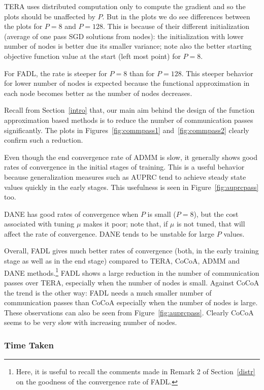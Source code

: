 \documentclass[twoside, 11pt]{article}
\begin{document}
TERA uses distributed computation only to compute the gradient and so the plots should be unaffected by $P$. But in the plots we do see differences between the plots for $P=8$ and $P=128$. This is because of their different initialization (average of one pass SGD solutions from nodes): the initialization with lower number of nodes is better due its smaller variance; note also the better starting objective function value at the start (left most point) for $P=8$.

For FADL, the rate is steeper for $P=8$ than for $P=128$. This steeper behavior for lower number of nodes is expected because the functional approximation in each node becomes better as the number of nodes decreases.

Recall from Section~\ref{intro} that, our main aim behind the design of the function approximation based methods is to reduce the number of communication passes significantly. The plots in Figures~\ref{fig:commpass1} and~\ref{fig:commpass2} clearly confirm such a reduction.

Even though the end convergence rate of ADMM is slow, it generally shows good rates of convergence in the initial stages of training. This is a useful behavior because generalization measures such as AUPRC tend to achieve steady state values quickly in the early stages. This usefulness is seen in Figure~\ref{fig:auprcpass} too.


DANE has good rates of convergence when $P$ is small ($P=8$), but the cost associated with tuning $\mu$ makes it poor; note that, if $\mu$ is not tuned, that will affect the rate of convergence. DANE tends to be unstable for large $P$ values.

Overall, FADL gives much better rates of convergence (both, in the early training stage as well as in the end stage) compared to TERA, CoCoA, ADMM and DANE methods.\footnote{Here, it is useful to recall the comments made in Remark 2 of Section~\ref{distr} on the goodness of the convergence rate of FADL.} FADL shows a large reduction in the number of communication passes over TERA, especially when the number of nodes is small. Against CoCoA the trend is the other way: FADL needs a much smaller number of communication passes than CoCoA especially when the number of nodes is large. These observations can also be seen from Figure~\ref{fig:auprcpass}. Clearly CoCoA seems to be very slow with increasing number of nodes.

\subsubsection{Time Taken}
\label{subsubsec:time}
\end{document}
